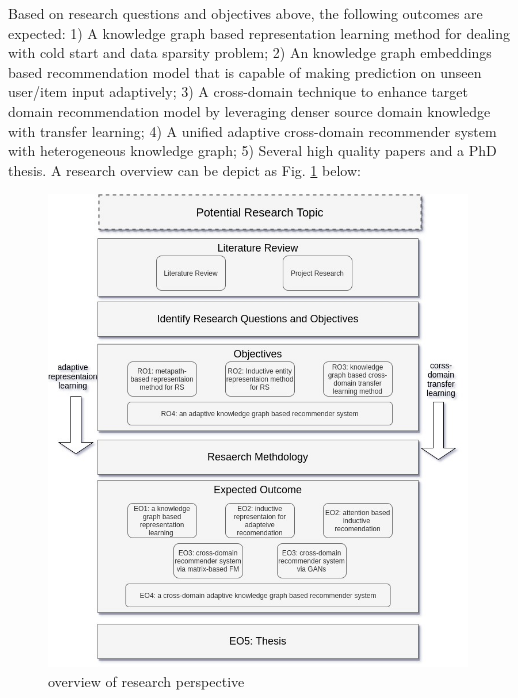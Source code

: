 Based on research questions and objectives above, the following outcomes are expected:
1) A knowledge graph based representation learning method for dealing with cold start and data sparsity problem;
2) An knowledge graph embeddings based recommendation model that is capable of making prediction on unseen user/item input adaptively;
3) A cross-domain technique to enhance target domain recommendation model by leveraging denser source domain knowledge with transfer learning;
4) A unified adaptive cross-domain recommender system with heterogeneous knowledge graph;
5) Several high quality papers and a PhD thesis. A research overview can be depict as Fig. \ref{fig:r_overview} below: 
\begin{figure}[!ht]
    \centering
    \includegraphics[width=0.99\textwidth]{figs/research_overview.jpg}
    \caption{overview of research perspective}\label{fig:r_overview}
\end{figure}
